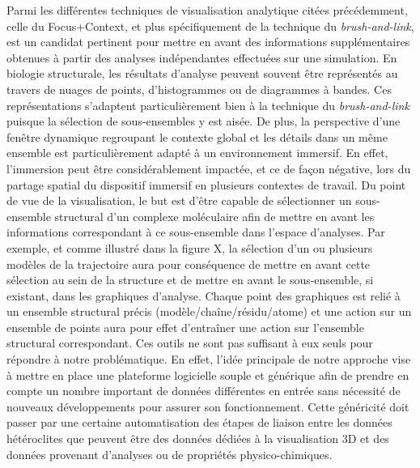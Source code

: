 Parmi les différentes techniques de visualisation analytique citées précédemment, celle du Focus+Context, et plus spécifiquement de la technique du \textit{brush-and-link}, est un candidat pertinent pour mettre en avant des informations supplémentaires obtenues à partir des analyses indépendantes effectuées sur une simulation. En biologie structurale, les résultats d'analyse peuvent souvent être représentés au travers de nuages de points, d'histogrammes ou de diagrammes à bandes. Ces représentations s'adaptent particulièrement bien à la technique du \textit{brush-and-link} puisque la sélection de sous-ensembles y est aisée. De plus, la perspective d'une fenêtre dynamique regroupant le contexte global et les détails dans un même ensemble est particulièrement adapté à un environnement immersif. En effet, l'immersion peut être considérablement impactée, et ce de façon négative, lors du partage spatial du dispositif immersif en plusieurs contextes de travail.
Du point de vue de la visualisation, le but est d'être capable de sélectionner un sous-ensemble structural d'un complexe moléculaire afin de mettre en avant les informations correspondant à ce sous-ensemble dans l'espace d'analyses. Par exemple, et comme illustré dans la figure X, la sélection d'un ou plusieurs modèles de la trajectoire aura pour conséquence de mettre en avant cette sélection au sein de la structure et de mettre en avant le sous-ensemble, si existant, dans les graphiques d'analyse. Chaque point des graphiques est relié à un ensemble structural précis (modèle/chaîne/résidu/atome) et une action sur un ensemble de points aura pour effet d’entraîner une action sur l'ensemble structural correspondant. 
Ces outils ne sont pas suffisant à eux seuls pour répondre à notre problématique. En effet, l'idée principale de notre approche vise à mettre en place une plateforme logicielle souple et générique afin de prendre en compte un nombre important de données différentes en entrée sans nécessité de nouveaux développements pour assurer son fonctionnement. Cette généricité doit passer par une certaine automatisation des étapes de liaison entre les données hétéroclites que peuvent être des données dédiées à la visualisation 3D et des données provenant d'analyses ou de propriétés physico-chimiques.


